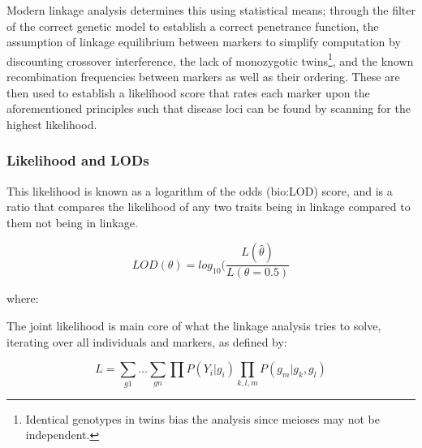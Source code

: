 Modern linkage analysis determines this using statistical means; through the filter of the correct genetic model to establish a correct penetrance function,  the assumption of linkage equilibrium between markers to simplify computation by discounting crossover interference, the lack of monozygotic twins\footnote{Identical genotypes in twins bias the analysis since meioses may not be independent.}, and the known recombination frequencies between markers as well as their ordering. These are then used to establish a likelihood score that rates each marker upon the aforementioned principles such that disease loci can be found by scanning for the highest likelihood.

\subsubsection{Likelihood and LODs}

This likelihood is known as a logarithm of the odds (\gls{bio:LOD}) score, and is a ratio  that compares the likelihood of any two traits being in linkage compared to them not being in linkage. 

\begin{equation}
LOD(\theta) = log_{10} (\frac{L(\hat{\theta})}{L(\theta = 0.5)}
\end{equation}

where:
\begin{itemize}[labelsep=2em, align=right, labelwidth=3em, labelindent=4em, leftmargin=*]
\end{itemize}

The joint likelihood is main core of what the linkage analysis tries to solve, iterating over all individuals and markers, as defined by:


\begin{equation}
L = \sum_{g1} \dots \sum_{gn} \prod P(Y_i|g_i) \prod_{k,l,m} P(g_m|g_k,g_l)
\end{equation}

